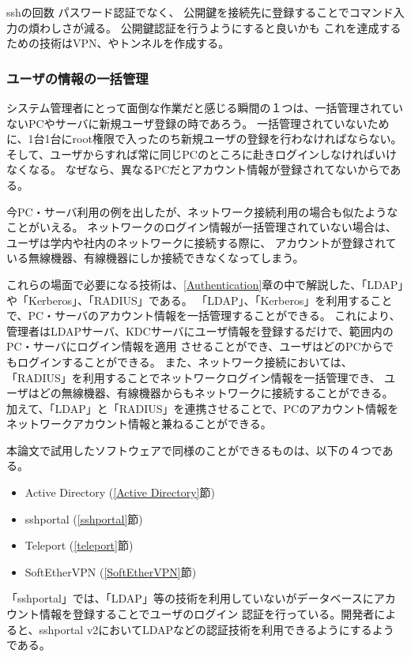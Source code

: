 \documentclass[11pt,a4j,titlepage]{jreport}
\begin{document}
sshの回数
パスワード認証でなく、
公開鍵を接続先に登録することでコマンド入力の煩わしさが減る。
公開鍵認証を行うようにすると良いかも
これを達成するための技術はVPN、やトンネルを作成する。
\fi

\subsubsection{ユーザの情報の一括管理}
システム管理者にとって面倒な作業だと感じる瞬間の１つは、一括管理されていないPCやサーバに新規ユーザ登録の時であろう。
一括管理されていないために、1台1台にroot権限で入ったのち新規ユーザの登録を行わなければならない。
そして、ユーザからすれば常に同じPCのところに赴きログインしなければいけなくなる。
なぜなら、異なるPCだとアカウント情報が登録されてないからである。


今PC・サーバ利用の例を出したが、ネットワーク接続利用の場合も似たようなことがいえる。
ネットワークのログイン情報が一括管理されていない場合は、 ユーザは学内や社内のネットワークに接続する際に、
アカウントが登録されている無線機器、有線機器にしか接続できなくなってしまう。

これらの場面で必要になる技術は、\ref{Authentication}章の中で解説した、「LDAP」や「Kerberos」、「RADIUS」である。
「LDAP」、「Kerberos」を利用することで、PC・サーバのアカウント情報を一括管理することができる。
これにより、管理者はLDAPサーバ、KDCサーバにユーザ情報を登録するだけで、範囲内のPC・サーバにログイン情報を適用
させることができ、ユーザはどのPCからでもログインすることができる。
また、ネットワーク接続においては、「RADIUS」を利用することでネットワークログイン情報を一括管理でき、
ユーザはどの無線機器、有線機器からもネットワークに接続することができる。
加えて、「LDAP」と「RADIUS」を連携させることで、PCのアカウント情報をネットワークアカウント情報と兼ねることができる。

\par 本論文で試用したソフトウェアで同様のことができるものは、以下の４つである。
\begin{itemize}
    \item Active Directory (\ref{Active Directory}節)
    \item sshportal (\ref{sshportal}節)
    \item Teleport (\ref{teleport}節)
    \item SoftEtherVPN (\ref{SoftEtherVPN}節)
\end{itemize}

「sshportal」では、「LDAP」等の技術を利用していないがデータベースにアカウント情報を登録することでユーザのログイン
認証を行っている。開発者によると、sshportal v2においてLDAPなどの認証技術を利用できるようにするようである。
\end{document}

